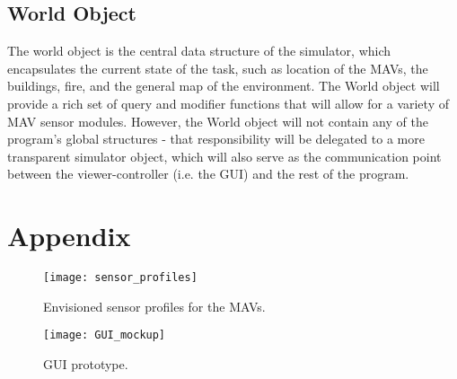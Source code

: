 \documentclass{article}
\begin{document}
\subsection{World Object}
The world object is the central data structure of the simulator, which encapsulates the current state of the task, such as location of the MAVs, the buildings, fire, and the general map of the environment.  The World object will provide a rich set of query and modifier functions that will allow for a variety of MAV sensor modules.  However, the World object will not contain any of the program's global structures - that responsibility will be delegated to a more transparent simulator object, which will also serve as the communication point between the viewer-controller (i.e. the GUI) and the rest of the program.


\section*{Appendix}
\begin{figure}[!b]
\centering
\texttt{[image: sensor\_profiles]}
\caption{Envisioned sensor profiles for the MAVs.}
\label{fig:sensor_profiles}
\end{figure}

\begin{figure}
\centering
\texttt{[image: GUI\_mockup]}
\caption{GUI prototype.}
\label{fig:sensor_profiles}
\end{figure}
\end{document}
